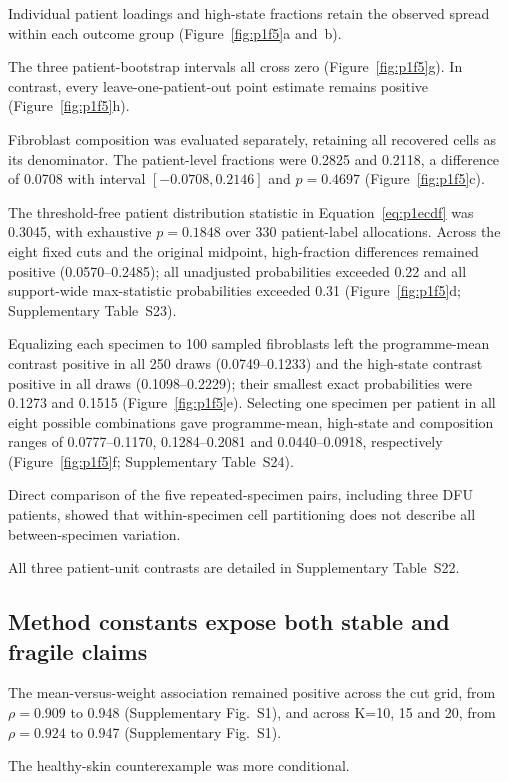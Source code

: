 \documentclass[10pt,a4paper]{article}
\begin{document}
Individual patient loadings and high-state fractions retain the observed spread within each outcome group (Figure~\ref{fig:p1f5}a and~b).

The three patient-bootstrap intervals all cross zero (Figure~\ref{fig:p1f5}g). In contrast, every leave-one-patient-out point estimate remains positive (Figure~\ref{fig:p1f5}h).

Fibroblast composition was evaluated separately, retaining all recovered cells as its denominator. The patient-level fractions were 0.2825 and 0.2118, a difference of 0.0708 with interval $[-0.0708,0.2146]$ and $p=0.4697$ (Figure~\ref{fig:p1f5}c).

The threshold-free patient distribution statistic in Equation~\eqref{eq:p1ecdf} was 0.3045, with exhaustive $p=0.1848$ over 330 patient-label allocations. Across the eight fixed cuts and the original midpoint, high-fraction differences remained positive (0.0570--0.2485); all unadjusted probabilities exceeded 0.22 and all support-wide max-statistic probabilities exceeded 0.31 (Figure~\ref{fig:p1f5}d; Supplementary Table~S23).

Equalizing each specimen to 100 sampled fibroblasts left the programme-mean contrast positive in all 250 draws (0.0749--0.1233) and the high-state contrast positive in all draws (0.1098--0.2229); their smallest exact probabilities were 0.1273 and 0.1515 (Figure~\ref{fig:p1f5}e). Selecting one specimen per patient in all eight possible combinations gave programme-mean, high-state and composition ranges of 0.0777--0.1170, 0.1284--0.2081 and 0.0440--0.0918, respectively (Figure~\ref{fig:p1f5}f; Supplementary Table~S24).

Direct comparison of the five repeated-specimen pairs, including three DFU patients, showed that within-specimen cell partitioning does not describe all between-specimen variation.

All three patient-unit contrasts are detailed in Supplementary Table~S22.

\subsection{Method constants expose both stable and fragile claims}


The mean-versus-weight association remained positive across the cut grid, from $\rho=0.909$ to 0.948 (Supplementary Fig.~S1\label{call:p1f6}), and across K=10, 15 and 20, from $\rho=0.924$ to 0.947 (Supplementary Fig.~S1).

The healthy-skin counterexample was more conditional.
\end{document}
